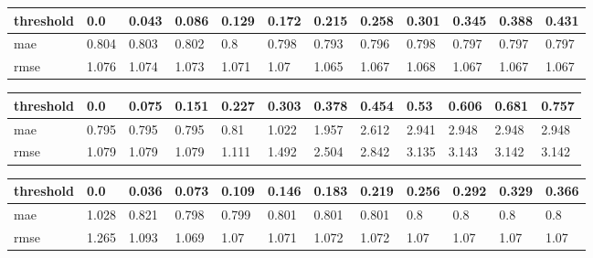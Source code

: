\begin{appendices}
\begin{center}\label{tab4}
	\begin{tabularx}{\textwidth}{|l|X|X|X|X|X|X|X|X|X|X|X|}
		\hline
		threshold & 0.0 & 0.043 & 0.086 & 0.129 & 0.172 & 0.215 & 0.258 & 0.301 & 0.345 & 0.388 & 0.431 \\ \hline
		mae & 0.804 & 0.803 & 0.802 & 0.8 & 0.798 & 0.793 & 0.796 & 0.798 & 0.797 & 0.797 & 0.797 \\ \hline
		rmse & 1.076 & 1.074 & 1.073 & 1.071 & 1.07 & 1.065 & 1.067 & 1.068 & 1.067 & 1.067 & 1.067 \\ \hline
	\end{tabularx}	
\end{center}

\begin{center}\label{tab5}
	\begin{tabularx}{\textwidth}{|l|X|X|X|X|X|X|X|X|X|X|X|}
		\hline
		threshold & 0.0 & 0.075 & 0.151 & 0.227 & 0.303 & 0.378 & 0.454 & 0.53 & 0.606 & 0.681 & 0.757 \\ \hline
		mae & 0.795 & 0.795 & 0.795 & 0.81 & 1.022 & 1.957 & 2.612 & 2.941 & 2.948 & 2.948 & 2.948 \\ \hline
		rmse & 1.079 & 1.079 & 1.079 & 1.111 & 1.492 & 2.504 & 2.842 & 3.135 & 3.143 & 3.142 & 3.142 \\ \hline
	\end{tabularx}	
\end{center}



\begin{center}\label{tab6}
	\begin{tabularx}{\textwidth}{|l|X|X|X|X|X|X|X|X|X|X|X|}
		\hline
		threshold & 0.0 & 0.036 & 0.073 & 0.109 & 0.146 & 0.183 & 0.219 & 0.256 & 0.292 & 0.329 & 0.366 \\ \hline
		mae & 1.028 & 0.821 & 0.798 & 0.799 & 0.801 & 0.801 & 0.801 & 0.8 & 0.8 & 0.8 & 0.8 \\ \hline
		rmse & 1.265 & 1.093 & 1.069 & 1.07 & 1.071 & 1.072 & 1.072 & 1.07 & 1.07 & 1.07 & 1.07 \\ \hline
	\end{tabularx}	
\end{center}



\end{appendices}
